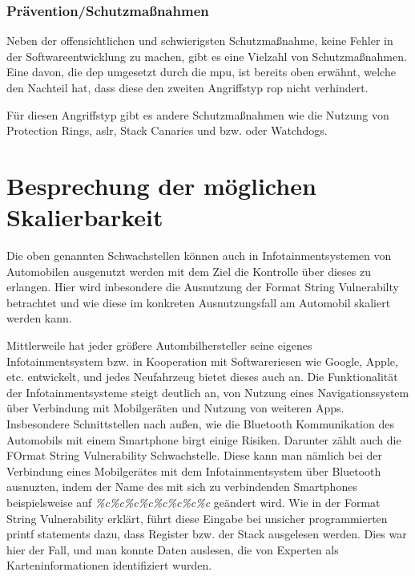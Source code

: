 \documentclass[a4paper,
DIV=13,
12pt,
BCOR=10mm,
department=FakIM,
oneside,
parskip=half,
automark,
listof=totocnumbered,
bibliography=totocnumbered,
acronym=totocnumbered
] {OTHRartcl}
\begin{document}
\subsubsection{Prävention/Schutzmaßnahmen}
Neben der offensichtlichen und schwierigsten Schutzmaßnahme, keine Fehler in der Softwareentwicklung zu machen, gibt es eine Vielzahl von Schutzmaßnahmen.
Eine davon, die \ac{dep} umgesetzt durch die \ac{mpu}, ist bereits oben erwähnt, welche den Nachteil hat, dass diese den zweiten Angriffstyp \ac{rop} nicht verhindert.

Für diesen Angriffstyp gibt es andere Schutzmaßnahmen wie die Nutzung von Protection Rings, \ac{aslr}, Stack Canaries und bzw. oder Watchdogs.


\newpage
\section{Besprechung der möglichen Skalierbarkeit}
Die oben genannten Schwachstellen können auch in Infotainmentsystemen von Automobilen ausgenutzt werden mit dem Ziel die Kontrolle über dieses zu erlangen.
Hier wird inbesondere die Ausnutzung der Format String Vulnerabilty betrachtet und wie diese im konkreten Ausnutzungsfall am Automobil skaliert werden kann.

Mittlerweile hat jeder größere Autombilhersteller seine eigenes Infotainmentsystem bzw. in Kooperation mit Softwareriesen wie Google, Apple, etc. entwickelt, und jedes Neufahrzeug
bietet dieses auch an. Die Funktionalität der Infotainmentsysteme steigt deutlich an, von Nutzung eines Navigationssystem über Verbindung mit Mobilgeräten und Nutzung von weiteren Apps.
Insbesondere Schnittstellen nach außen, wie die Bluetooth Kommunikation des Automobils mit einem Smartphone birgt einige Risiken.
Darunter zählt auch die FOrmat String Vulnerability Schwachstelle. Diese kann man nämlich bei der Verbindung eines Mobilgerätes mit dem Infotainmentsystem über Bluetooth
ausnuzten, indem der Name des mit sich zu verbindenden Smartphones beispielsweise auf \textit{\%c\%c\%c\%c\%c\%c\%c\%c} geändert wird.
Wie in der Format String Vulnerability erklärt, führt diese Eingabe bei unsicher programmierten printf statements dazu, dass Register bzw. der Stack ausgelesen werden.
Dies war hier der Fall, und man konnte Daten auslesen, die von Experten als Karteninformationen identifiziert wurden.
\end{document}

